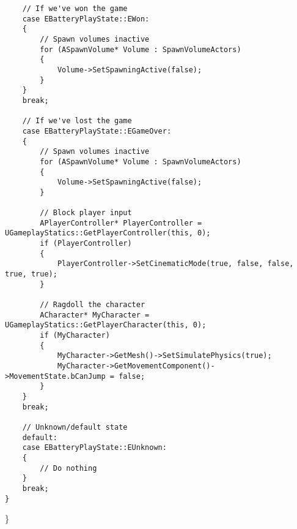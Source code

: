 \documentclass[
  letterpaper,
  DIV=11,
  numbers=noendperiod]{scrartcl}
\begin{document}
\begin{verbatim}
    // If we've won the game 
    case EBatteryPlayState::EWon:
    {
        // Spawn volumes inactive
        for (ASpawnVolume* Volume : SpawnVolumeActors)
        {
            Volume->SetSpawningActive(false);
        }
    }
    break;
    
    // If we've lost the game
    case EBatteryPlayState::EGameOver:
    {
        // Spawn volumes inactive
        for (ASpawnVolume* Volume : SpawnVolumeActors)
        {
            Volume->SetSpawningActive(false);
        }
        
        // Block player input
        APlayerController* PlayerController = UGameplayStatics::GetPlayerController(this, 0);
        if (PlayerController)
        {
            PlayerController->SetCinematicMode(true, false, false, true, true);
        }
        
        // Ragdoll the character
        ACharacter* MyCharacter = UGameplayStatics::GetPlayerCharacter(this, 0);
        if (MyCharacter)
        {
            MyCharacter->GetMesh()->SetSimulatePhysics(true);
            MyCharacter->GetMovementComponent()->MovementState.bCanJump = false;
        }
    }
    break;
    
    // Unknown/default state
    default:
    case EBatteryPlayState::EUnknown:
    {
        // Do nothing
    }
    break;
}
\end{verbatim}

\}
\end{document}
